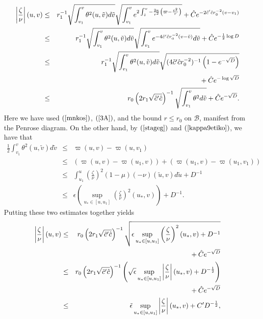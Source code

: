 \documentclass{article}
\newcommand{\zn}{\frac{\zeta}{\nu}}
\begin{document}
\begin{eqnarray*}
\left|\zn\right|(u,v)	&\le&	r_1^{-1}\sqrt{\int_{v_1}^v\theta^2(u,\tilde{v})d\tilde{v}}
						\sqrt{\int_{v_1}^v{e^{2\int_{\tilde{v}}^v
						-\frac{2\kappa}{r^2}\left(
						\varpi-\frac{e^2}r\right)}}}
						+\hat{C}e^{-{2\tilde{c}'
						\hat{c}r_0^{-2}}(v-v_1)}\\
			&\le&	r_1^{-1}\sqrt{\int_{v_1}^v\theta^2(u,\tilde{v})d\tilde{v}}
						\sqrt{\int_{v_1}^v
						{e^{-{4\tilde{c}'\hat{c}r_0^{-2}}
						(v-\tilde{v})}d\tilde{v}}}+
					\hat{C}e^{-\frac12\log D}\\
			&\le&	r_1^{-1}\sqrt{\int_{v_1}^v\theta^2(u,\tilde{v})d\tilde{v}}
					\sqrt{({4\tilde{c}'\hat{c}r_0^{-2}})^{-1}
						\left(1-e^{-\sqrt{D}}\right)}\\
			&   &	\hbox{}
						+\hat{C}e^{-
						\log \sqrt{D}}\\
			&\le&	r_0\left(2r_1\sqrt{\tilde{c}'\hat{c}}\right)^{-1}	
						\sqrt{\int_{v_1}^v\theta^2d\tilde{v}}+
					\hat{C}e^{-\sqrt{D}}.
\end{eqnarray*}
Here we have used $(\ref{mnkos})$, $(\ref{3A})$,
and the bound $r\le r_0$ on $\mathcal{B}$,
manifest from the Penrose diagram.
On the other hand, by $(\ref{stageg})$ and $(\ref{kappa9etiko})$, we have that
\begin{eqnarray*}
\frac12\int_{v_1}^v\theta^2(u,\tilde{v})d\tilde{v}	&\le&	
						\varpi(u,v)-\varpi(u,v_1)\\
				&\le&	(\varpi(u,v)-\varpi(u_1,v))+
					(\varpi(u_1,v)-\varpi(u_1,v_1))\\
				&\le&	\int_{u_1}^u{\left(\zn\right)^2(1-\mu)(-\nu) 
						(\tilde{u},v)d\tilde{u}}
							+D^{-1}\\
				&\le&	\epsilon\left(\sup_{u_*\in[u,u_1]}
						\left(\zn\right)^2(u_*,v)\right)
							+D^{-1}.
\end{eqnarray*}
Putting these two estimates together yields
\begin{eqnarray*}
\left|\zn\right|(u,v)	&\le&	r_0\left(2r_1\sqrt{\tilde{c}'\hat{c}}\right)^{-1}\sqrt{\epsilon\sup_{u_*\in[u,u_1]}
						\left(\zn\right)^2(u_*,v)
						+D^{-1}}\\
			&   &	\hbox{\ \ }+\hat{C}
						e^{-\sqrt{D}}\\
			&\le&	r_0\left(2r_1\sqrt{\tilde{c}'\hat{c}}
						\right)^{-1}\left(\sqrt{\epsilon}
						\sup_{u_*\in[u,u_1]}\left|\zn\right|
						(u_*,v)
						+D^{-\frac12}\right)\\
			&   & 	\hbox{\ \ }+\hat{C}e^{-\sqrt{D}}\\
			&\le&	\tilde{\epsilon}\sup_{u_*\in[u,u_1]}\left|\zn\right|
						(u_*,v)
						+C'D^{-\frac12},
\end{eqnarray*}
\end{document}
